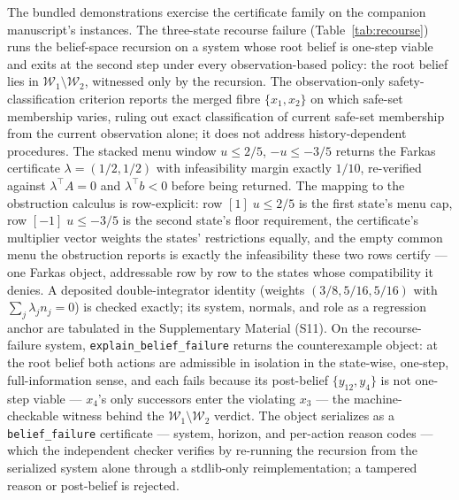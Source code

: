 \documentclass[3p,11pt]{elsarticle}
\begin{document}
The bundled demonstrations exercise the certificate family on the companion
manuscript's instances. The three-state recourse failure
(Table~\ref{tab:recourse}) runs the
belief-space recursion on a system whose root belief is one-step viable and
exits at the second step under every observation-based policy: the root
belief lies in $\mathcal{W}_1 \setminus \mathcal{W}_2$, witnessed only by
the recursion. The observation-only safety-classification criterion
reports the merged fibre $\{x_1, x_2\}$ on which safe-set membership
varies, ruling out exact classification of current safe-set membership
from the current observation alone; it does not address
history-dependent procedures. The stacked menu window $u \leq 2/5$, $-u \leq -3/5$ returns the
Farkas certificate $\lambda = (1/2, 1/2)$ with infeasibility margin exactly
$1/10$, re-verified against $\lambda^{\top} A = 0$ and
$\lambda^{\top} b < 0$ before being returned. The mapping to the
obstruction calculus is row-explicit: row $[1]\; u \leq 2/5$ is the first
state's menu cap, row $[-1]\; u \leq -3/5$ is the second state's floor
requirement, the certificate's multiplier vector weights the states'
restrictions equally, and the empty common menu the obstruction reports
is exactly the infeasibility these two rows certify --- one Farkas object,
addressable row by row to the states whose compatibility it denies. A deposited
double-integrator identity (weights $(3/8, 5/16, 5/16)$ with
$\sum_j \lambda_j n_j = 0$) is checked exactly; its system, normals,
and role as a regression anchor are tabulated in the Supplementary
Material (S11). On the recourse-failure
system, \texttt{explain\_belief\_failure} returns the counterexample
object: at the root belief both actions are admissible in isolation in
the state-wise, one-step, full-information sense, and
each fails because its post-belief $\{y_{12}, y_4\}$ is not one-step
viable --- $x_4$'s only successors enter the violating $x_3$ --- the
machine-checkable witness behind the
$\mathcal{W}_1 \setminus \mathcal{W}_2$ verdict. The object serializes
as a \texttt{belief\_failure} certificate --- system, horizon, and
per-action reason codes --- which the independent checker verifies by
re-running the recursion from the serialized system alone through a
stdlib-only reimplementation; a tampered reason or post-belief is
rejected.
\end{document}
